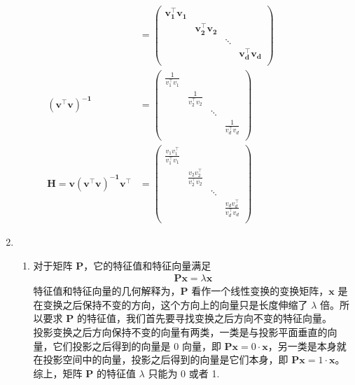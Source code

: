 \documentclass[11pt,letter,notitlepage]{article}
\begin{document}
\begin{solution}
\begin{enumerate}
\begin{enumerate}
$$			$$
			$\quad \begin{aligned} & \mathbf{=\left(\begin{array}{cccc}{v_{1}^{\top} v_{1}} \\ \  & {v_{2}^{\top} v_{2}} \\ \ & \ & \ddots \\ \ & & & {v_{d}^{\top} v_{d}} \\ \end{array}\right)} \\ \mathbf{\left(v^{\top} v\right)^{-1}} &=\left(\begin{array}{cccc} \frac{1}{{v_{1}^{\top} v_{1}}} \\ \  & \frac{1}{{v_{2}^{\top} v_{2}}} \\ \ & \ & \ddots \\ \ & & & \frac{1}{{v_{d}^{\top} v_{d}}} \\ \end{array}\right) \\ \mathbf{H=v\left(v^{\top} v\right)^{-1} v^{\top}} &=\left(\begin{array}{cccc} \frac{v_1v_1^{\top}}{{v_{1}^{\top} v_{1}}} \\ \  & \frac{v_2v_2^{\top}}{{v_{2}^{\top} v_{2}}} \\ \ & \ & \ddots \\ \ & & & \frac{v_dv_d^{\top}}{{v_{d}^{\top} v_{d}}} \\ \end{array}\right) \end{aligned}$
		\end{enumerate}
		\item 
		\begin{enumerate}
			\item 对于矩阵 $\mathbf{P}$，它的特征值和特征向量满足
				\begin{align*}
					\mathbf{P}\mathbf{x} = \lambda\mathbf{x}
				\end{align*}
			特征值和特征向量的几何解释为，$\mathbf{P}$ 看作一个线性变换的变换矩阵，$\mathbf{x}$ 是在变换之后保持不变的方向，这个方向上的向量只是长度伸缩了 $\lambda$ 倍。所以要求 $\mathbf{P}$ 的特征值，我们首先要寻找变换之后方向不变的特征向量。\\
			投影变换之后方向保持不变的向量有两类，一类是与投影平面垂直的向量，它们投影之后得到的向量是 $0$ 向量，即 $\mathbf{P}\mathbf{x} = 0 \cdot \mathbf{x} $，另一类是本身就在投影空间中的向量，投影之后得到的向量是它们本身，即 $\mathbf{P}\mathbf{x} = 1 \cdot \mathbf{x}$。综上，矩阵 $\mathbf{P}$ 的特征值 $\lambda$ 只能为 0 或者 1.

\end{enumerate}
\end{enumerate}
\end{solution}
\end{document}
